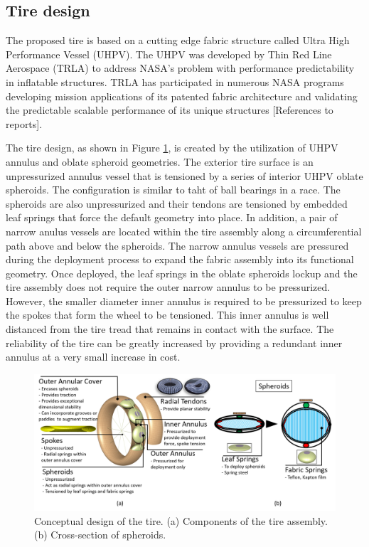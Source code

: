 \documentclass{article}
\begin{document}
\subsection{Tire design}
The proposed tire is based on a cutting edge fabric structure called Ultra High Performance Vessel (UHPV). The UHPV was developed by Thin Red Line Aerospace (TRLA) to address NASA's problem with performance predictability in inflatable structures. TRLA has participated in numerous NASA programs developing mission applications of its patented fabric architecture and validating the predictable scalable performance of its unique structures [References to reports]. 

The tire design, as shown in Figure \ref{fig:tire_design_original}, is created by the utilization of UHPV annulus and oblate spheroid geometries. The exterior tire surface is an unpressurized annulus vessel that is tensioned by a series of interior UHPV oblate spheroids. The configuration is similar to taht of ball bearings in a race. The spheroids are also unpressurized and their tendons are tensioned by embedded leaf springs that force the default geometry into place. In addition, a pair of narrow anulus vessels are located within the tire assembly along a circumferential path above and below the spheroids. The narrow annulus vessels are pressured during the deployment process to expand the fabric assembly into its functional geometry. Once deployed, the leaf springs in the oblate spheroids lockup and the tire assembly does not require the outer narrow annulus to be pressurized. However, the smaller diameter inner annulus is required to be pressurized to keep the spokes that form the wheel to be tensioned. This inner annulus is well distanced from the tire tread that remains in contact with the surface. The reliability of the tire can be greatly increased by providing a redundant inner annulus at a very small increase in cost.

\begin{figure}[hbt!]
\centering
\includegraphics[width=1\textwidth]{general-images/tire_design_original.png}
\caption{Conceptual design of the tire. (a) Components of the tire assembly. (b) Cross-section of spheroids.}
\label{fig:tire_design_original}
\end{figure}
\end{document}
